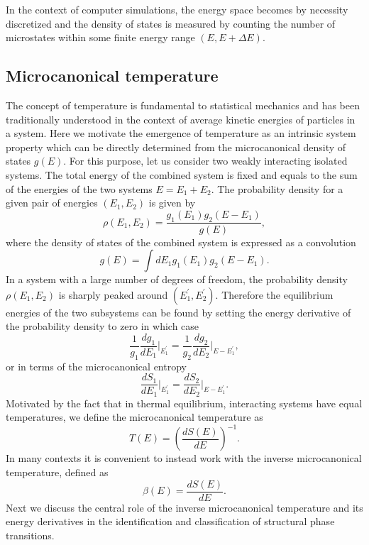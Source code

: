 \documentclass[12pt]{report}
\begin{document}
In the context of computer simulations, the energy space becomes by necessity discretized and the density of states is measured by counting the number of microstates within some finite energy range $(E,E+\Delta E)$.  

\subsection{Microcanonical temperature}
The concept of temperature is fundamental to statistical mechanics and has been traditionally understood in the context of average kinetic energies of particles in a system. Here we motivate the emergence of temperature as an intrinsic system property which can be directly determined from the microcanonical density of states $g(E)$. For this purpose, let us consider two weakly interacting isolated systems. The total energy of the combined system is fixed and equals to the sum of the energies of the two systems $E = E_{1} + E_{2}$. The probability density for a given pair of energies $(E_{1},E_{2})$ is given by 
\begin{equation}
\rho(E_{1},E_{2}) = \frac{g_{1}(E_{1})g_{2}(E-E_{1})}{g(E)},
\end{equation}
where the density of states of the combined system is expressed as a convolution
\begin{equation}
g(E) = \int dE_{1}g_{1}(E_{1})g_{2}(E-E_{1}).
\end{equation}
In a system with a large number of degrees of freedom, the probability density $\rho(E_{1},E_{2})$ is sharply peaked around $(E^{'}_{1},E^{'}_{2})$. Therefore the equilibrium energies of the two subsystems can be found by setting the energy derivative of the probability density to zero in which case 
\begin{equation}
\frac{1}{g_{1}}\frac{dg_{1}}{dE_{1}}\bigg|_{E^{'}_{1}} = \frac{1}{g_{2}}\frac{dg_{2}}{dE_{2}}\bigg|_{E - E^{'}_{1}},
\end{equation}
or in terms of the microcanonical entropy
\begin{equation}
\frac{dS_{1}}{dE_1}\bigg|_{E^{'}_{1}} = \frac{dS_{2}}{dE_{2}}\bigg|_{E - E^{'}_{1}}.
\end{equation}
Motivated by the fact that in thermal equilibrium, interacting systems have equal temperatures, we define the microcanonical temperature as 
\begin{equation}
T(E) = \left(\frac{dS(E)}{dE}\right)^{-1}.
\end{equation}
In many contexts it is convenient to instead work with the inverse microcanonical temperature, defined as 
\begin{equation}
\beta(E) = \frac{dS(E)}{dE}.
\end{equation}
Next we discuss the central role of the inverse microcanonical temperature and its energy derivatives in the identification and classification of structural phase transitions.
\end{document}
